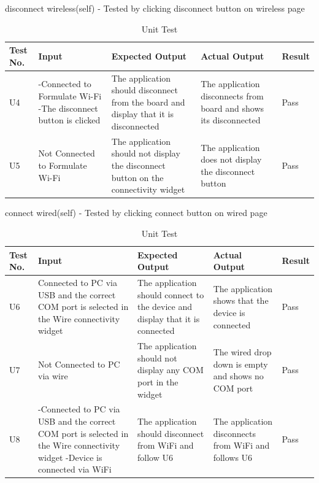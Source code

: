 \documentclass[12pt, titlepage]{article}
\begin{document}
disconnect wireless(self) - Tested by clicking disconnect button on wireless page
\begin{table}[H]
  \begin{tabular}{| p{} | p{}| p{}| p{}| p{}|}
    \hline
    \rowcolor[gray]{0.9}
    Test No. & Input & Expected Output & Actual Output & Result\\
    \hline
    U4 & -Connected to Formulate Wi-Fi -The disconnect button is clicked & The application should disconnect from the board and display that it is disconnected & The application disconnects from board and shows its disconnected & Pass \\
    \hline
    U5 & Not Connected to Formulate Wi-Fi  & The application should not display the disconnect button on the connectivity widget & The application does not display the disconnect button & Pass \\
    \hline
  \end{tabular}
  \caption{Unit Test}
  \end{table}

  connect wired(self) - Tested by clicking connect button on wired page
  \begin{table}[H]
    \begin{tabular}{| p{} | p{}| p{}| p{}| p{}|}
      \hline
      \rowcolor[gray]{0.9}
      Test No. & Input & Expected Output & Actual Output & Result\\
      \hline
      U6 & Connected to PC via USB and the correct COM port is selected in the Wire connectivity widget & The application should connect to the device and display that it is connected & The application shows that the device is connected & Pass \\
      \hline
      U7 & Not Connected to PC via wire  & The application should not display any COM port in the widget & The wired drop down is empty and shows no COM port & Pass \\
      \hline
      U8 & -Connected to PC via USB and the correct COM port is selected in the Wire connectivity widget -Device is connected via WiFi & The application should disconnect from WiFi and follow U6 & The application disconnects from WiFi and follows U6 & Pass \\
      \hline
    \end{tabular}
    \caption{Unit Test}
    \end{table}
  
\end{document}
